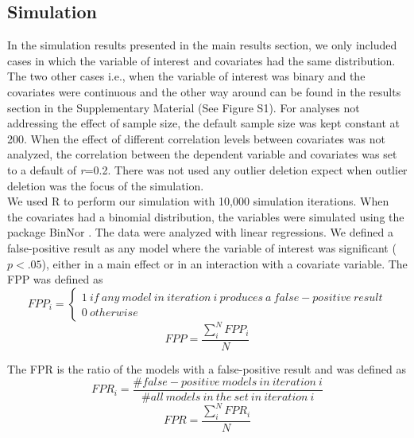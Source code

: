\subsection{Simulation}
In the simulation results presented in the main results section, we only included cases in which the variable of interest and covariates had the same distribution. The two other cases i.e., when the variable of interest was binary and the covariates were continuous and the other way around can be found in the results section in the Supplementary Material (See Figure S1). For analyses not addressing the effect of sample size, the default sample size was kept constant at 200. When the effect of different correlation levels between covariates was not analyzed, the correlation between the dependent variable and covariates was set to a default of \textit{r}=0.2. There was not used any outlier deletion expect when outlier deletion was the focus of the simulation.\\
We used R \citep{Team2018} to perform our simulation with 10,000 simulation iterations. When the covariates had a binomial distribution, the variables were simulated using the package BinNor \citep{Demirtas2014}. The data were analyzed with linear regressions. We defined a false-positive result as any model where the variable of interest was significant ($p < .05$), either in a main effect or in an interaction with a covariate variable. The FPP was defined as \\

\[FPP_i=\left. \left\{\begin{array}{c}
1\ if\ any\ model\ in\ iteration\ i\ produces\ a\ false-positive\ result \\ 
0\ otherwise\  \end{array}
\right.\] 
\[FPP=\frac{\sum_{i}^{N}{FPP_i}}{N}\] 

The FPR is the ratio of the models with a false-positive result and was defined as \\

\[FPR_i=\frac{\#false-positive\ models\ in\ iteration\ i}{\#all\ models\ in\ the\ set\ in\ iteration\ i}\] 
\[FPR=\frac{\sum_{i}^{N}{FPR_i}}{N}\] 



